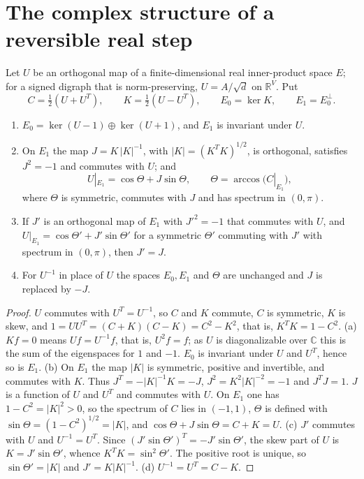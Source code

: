 \section{The complex structure of a reversible real step}\label{sec:polar}

Let $U$ be an orthogonal map of a finite-dimensional real inner-product space $E$; for a signed digraph that is norm-preserving, $U=A/\sqrt d$ on $\mathbb{R}^V$. Put
\[
C=\tfrac12(U+U^{T}),\qquad K=\tfrac12(U-U^{T}),\qquad E_0=\ker K,\qquad E_1=E_0^{\perp}.
\]

\begin{proposition}\label{prop:polar}
\begin{enumerate}[label=(\alph*)]
\item $E_0=\ker(U-1)\oplus\ker(U+1)$, and $E_1$ is invariant under $U$.
\item On $E_1$ the map $J=K\,|K|^{-1}$, with $|K|=(K^TK)^{1/2}$, is orthogonal, satisfies $J^2=-1$ and commutes with $U$; and
\begin{equation}\label{eq:polar}
U|_{E_1}=\cos\Theta+J\sin\Theta,\qquad \Theta=\arccos\bigl(C|_{E_1}\bigr),
\end{equation}
where $\Theta$ is symmetric, commutes with $J$ and has spectrum in $(0,\pi)$.
\item If $J'$ is an orthogonal map of $E_1$ with $J'^2=-1$ that commutes with $U$, and $U|_{E_1}=\cos\Theta'+J'\sin\Theta'$ for a symmetric $\Theta'$ commuting with $J'$ with spectrum in $(0,\pi)$, then $J'=J$.
\item For $U^{-1}$ in place of $U$ the spaces $E_0,E_1$ and $\Theta$ are unchanged and $J$ is replaced by $-J$.
\end{enumerate}
\end{proposition}
\begin{proof}
$U$ commutes with $U^T=U^{-1}$, so $C$ and $K$ commute, $C$ is symmetric, $K$ is skew, and $1=UU^T=(C+K)(C-K)=C^2-K^2$, that is, $K^TK=1-C^2$. (a) $Kf=0$ means $Uf=U^{-1}f$, that is, $U^2f=f$; as $U$ is diagonalizable over $\mathbb{C}$ this is the sum of the eigenspaces for $1$ and $-1$. $E_0$ is invariant under $U$ and $U^T$, hence so is $E_1$. (b) On $E_1$ the map $|K|$ is symmetric, positive and invertible, and commutes with $K$. Thus $J^T=-|K|^{-1}K=-J$, $J^2=K^2|K|^{-2}=-1$ and $J^TJ=1$. $J$ is a function of $U$ and $U^T$ and commutes with $U$. On $E_1$ one has $1-C^2=|K|^2>0$, so the spectrum of $C$ lies in $(-1,1)$, $\Theta$ is defined with $\sin\Theta=(1-C^2)^{1/2}=|K|$, and $\cos\Theta+J\sin\Theta=C+K=U$. (c) $J'$ commutes with $U$ and $U^{-1}=U^T$. Since $(J'\sin\Theta')^T=-J'\sin\Theta'$, the skew part of $U$ is $K=J'\sin\Theta'$, whence $K^TK=\sin^2\Theta'$. The positive root is unique, so $\sin\Theta'=|K|$ and $J'=K|K|^{-1}$. (d) $U^{-1}=U^T=C-K$.
\end{proof}

